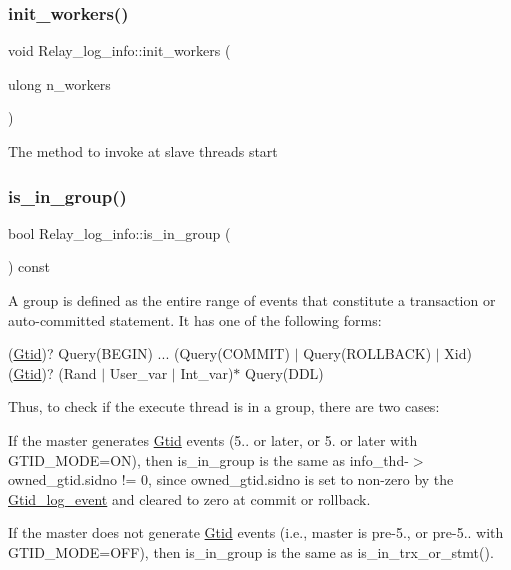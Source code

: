 \subsubsection{\texorpdfstring{init\+\_\+workers()}{init\_workers()}}
{\footnotesize\ttfamily void Relay\+\_\+log\+\_\+info\+::init\+\_\+workers (\begin{DoxyParamCaption}\item[{ulong}]{n\+\_\+workers }\end{DoxyParamCaption})}

The method to invoke at slave threads start \mbox{\label{classRelay__log__info_a14b055b1320a2a7cd3f9c4a9df960092}} 
\subsubsection{\texorpdfstring{is\+\_\+in\+\_\+group()}{is\_in\_group()}}
{\footnotesize\ttfamily bool Relay\+\_\+log\+\_\+info\+::is\+\_\+in\+\_\+group (\begin{DoxyParamCaption}{ }\end{DoxyParamCaption}) const\hspace{0.3cm}{\ttfamily [inline]}}

A group is defined as the entire range of events that constitute a transaction or auto-\/committed statement. It has one of the following forms\+:

(\mbox{\hyperlink{structGtid}{Gtid}})? Query(\+B\+E\+G\+I\+N) ... (Query(\+C\+O\+M\+M\+I\+T) $\vert$ Query(\+R\+O\+L\+L\+B\+A\+C\+K) $\vert$ Xid) (\mbox{\hyperlink{structGtid}{Gtid}})? (Rand $\vert$ User\+\_\+var $\vert$ Int\+\_\+var)$\ast$ Query(\+D\+D\+L)

Thus, to check if the execute thread is in a group, there are two cases\+:


\begin{DoxyItemize}
\item If the master generates \mbox{\hyperlink{structGtid}{Gtid}} events (5.. or later, or 5. or later with G\+T\+I\+D\+\_\+\+M\+O\+DE=ON), then is\+\_\+in\+\_\+group is the same as info\+\_\+thd-\/$>$owned\+\_\+gtid.\+sidno != 0, since owned\+\_\+gtid.\+sidno is set to non-\/zero by the \mbox{\hyperlink{classGtid__log__event}{Gtid\+\_\+log\+\_\+event}} and cleared to zero at commit or rollback.
\item If the master does not generate \mbox{\hyperlink{structGtid}{Gtid}} events (i.\+e., master is pre-\/5., or pre-\/5.. with G\+T\+I\+D\+\_\+\+M\+O\+DE=O\+FF), then is\+\_\+in\+\_\+group is the same as is\+\_\+in\+\_\+trx\+\_\+or\+\_\+stmt().
\end{DoxyItemize}


